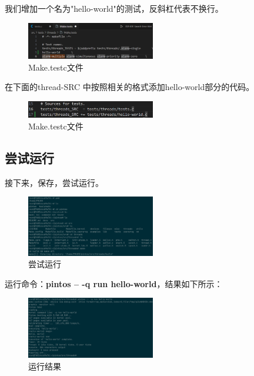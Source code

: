 我们增加一个名为"hello-world"的测试，反斜杠代表不换行。

\begin{figure}[H]
  \centering
  \includegraphics[width=0.5\textwidth]{img2/4.png}
  \caption{Make.testc文件}
\end{figure}

在下面的thread-SRC 中按照相关的格式添加hello-world部分的代码。

\begin{figure}[H]
  \centering
  \includegraphics[width=0.5\textwidth]{img2/5.png}
  \caption{Make.testc文件}
\end{figure}

\subsection{尝试运行}

接下来，保存，尝试运行。

\begin{figure}[H]
  \centering
  \includegraphics[width=0.5\textwidth]{img2/6.png}
  \caption{尝试运行}
\end{figure}

运行命令：\textbf{pintos -- -q run hello-world}，结果如下所示：

\begin{figure}[H]
  \centering
  \includegraphics[width=0.5\textwidth]{img2/success.png}
  \caption{运行结果}
\end{figure}

